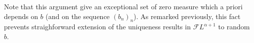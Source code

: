 \documentclass[11pt,a4paper,draft,reqno]{amsart}
\theoremstyle{definition}
\newcommand{\cF}{\mathcal{F}}
\begin{document}
Note that this argument give  an exceptional set of zero measure which a priori depends on $b$ (and on the sequence $(b_n)_n$). As remarked previously, this fact prevents straighforward extension of the uniqueness results in $\cF L^{\alpha+1}$ to random $b$. 

\end{document}
